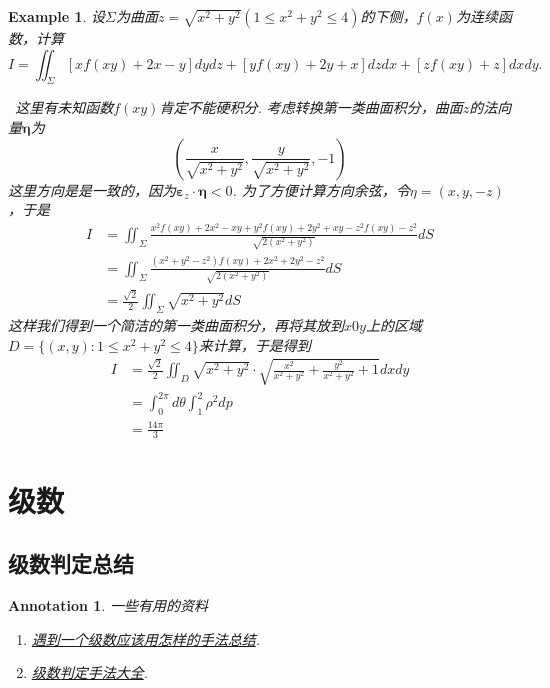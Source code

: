 \documentclass{article}
\newtheorem{example}[theorem]{Example}
\newtheorem{annotation}[theorem]{Annotation}
\newcommand{\hints}{{\color{blue} \text{hints}}}
\begin{document}
\begin{example}
\rm 设$\Sigma$为曲面$z = \sqrt{x^2 + y^2}(1 \leq x^2 + y^2 \leq 4)$的下侧，$f(x)$为连续函数，计算
$$
I = \iint_\Sigma [xf(xy) + 2x-y]dydz + [yf(xy) + 2y + x]dzdx + [zf(xy) + z]dxdy. 
$$

\hints\ 这里有未知函数$f(xy)$肯定不能硬积分. 考虑转换第一类曲面积分，曲面$z$的法向量$\bm{\eta}$为
$$
(\frac{x}{\sqrt{x^2+y^2}},\frac{y}{\sqrt{x^2+y^2}},-1)
$$
这里方向是是一致的，因为$\bm{\varepsilon}_z \cdot \bm{\eta} < 0$. 为了方便计算方向余弦，令$\eta = (x,y,-z)$，于是
$$
\begin{aligned}
I &= \iint_{\Sigma} \frac{x^2f(xy) + 2x^2-xy + y^2f(xy)+2y^2 + xy - z^2f(xy)-z^2}{\sqrt{2(x^2+y^2)}}dS\\
& =  \iint_{\Sigma} \frac{(x^2+y^2-z^2)f(xy) + 2x^2+2y^2-z^2}{\sqrt{2(x^2+y^2)}}dS \\
& = \frac{\sqrt{2}}{2} \iint_{\Sigma} \sqrt{x^2 + y^2}dS
\end{aligned}
$$
这样我们得到一个简洁的第一类曲面积分，再将其放到$x0y$上的区域$D=\{(x,y): 1 \leq x^2 + y^2 \leq 4\}$来计算，于是得到
$$
\begin{aligned}
I &= \frac{\sqrt{2}}{2} \iint_D \sqrt{x^2 + y^2} \cdot  \sqrt{\frac{x^2}{x^2+y^2} + \frac{y^2}{x^2+y^2} + 1}dxdy \\
&= \int_0^{2\pi} d\theta \int_1^2 \rho^2 dp\\
&= \frac{14\pi}{3}
\end{aligned}
$$
\end{example}

\newpage
\section{级数}

\subsection{级数判定总结}

\begin{annotation}
\rm 一些有用的资料
\begin{enumerate}
	\item \href{https://sites.lafayette.edu/thompsmc/files/2016/03/Series_Summary.pdf}{遇到一个级数应该用怎样的手法总结}.
	\item \href{https://en.wikipedia.org/wiki/Convergence_tests}{级数判定手法大全}.
\end{enumerate}
\end{annotation}
\end{document}
